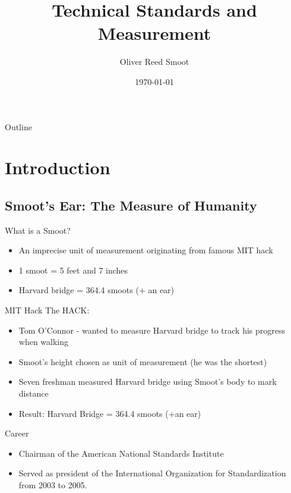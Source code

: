 \documentclass{beamer}
\title{Technical Standards and Measurement}
\author{Oliver Reed Smoot}
\date{\today}
\begin{document}

\frame{\titlepage}

\section[Outline]{}
\begin{frame}{Outline}
  \tableofcontents
\end{frame}

\section{Introduction}
\subsection{Smoot's Ear: The Measure of Humanity}
\begin{frame}{What is a Smoot?}
  \begin{itemize}
    \item An imprecise unit of measurement originating from famous MIT hack
    \item 1 smoot = 5 feet and 7 inches
    \item Harvard bridge = 364.4 smoots (+ an ear)
  \end{itemize}
\end{frame}
\begin{frame}{MIT Hack}
  The HACK:
  \pause
  \begin{itemize}
    \item<2-> Tom O'Connor - wanted to measure Harvard bridge to track his progress when walking
    \item<3-> Smoot's height chosen as unit of measurement (he was the shortest)
    \item<4-> Seven freshman measured Harvard bridge using Smoot's body to mark distance
    \item<5-> Result: Harvard Bridge = 364.4 smoots (+an ear)
  \end{itemize}
\end{frame}
\begin{frame}{Career}
  \begin{itemize}
    \item<1-> Chairman of the American National Standards Institute 
    \item<2-> Served as president of the International Organization for Standardization from 2003 to 2005.
  \end{itemize}
\end{frame}
\end{document}
